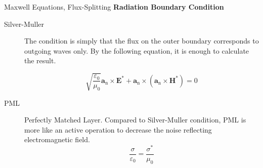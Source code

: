 \begin{frame}{Maxwell Equations, Flux-Splitting}
\textbf{Radiation Boundary Condition}
\begin{description}
    \item[Silver-Muller] The condition is simply that the flux on the outer boundary corresponds
to outgoing waves only. By the following equation, it is enough to calculate the result.

\begin{equation}
\sqrt{\frac{\varepsilon_{0}}{\mu_{0}}} \boldsymbol{a}_{\mathrm{n}} \times \boldsymbol{E}^{*}+\boldsymbol{a}_{\mathrm{n}} \times\left(\boldsymbol{a}_{\mathrm{n}} \times \boldsymbol{H}^{*}\right)=0
\end{equation}
    \item[PML] Perfectly Matched Layer. Compared to Silver-Muller condition, PML is more like an active operation to decrease the noise reflecting electromagnetic field.
    \begin{equation}
\frac{\sigma}{\varepsilon_{0}}=\frac{\sigma^{*}}{\mu_{0}}
\end{equation}
\end{description}

\end{frame}
